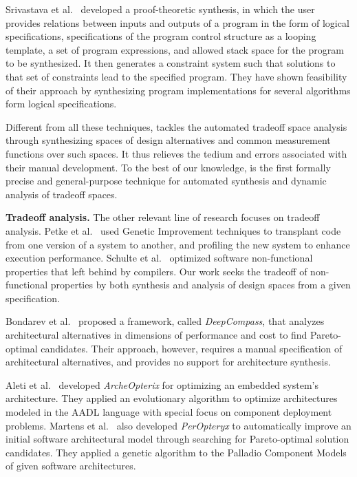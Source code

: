 \documentclass{sig-alternate}
\begin{document}
Srivastava et al.~\cite{srivastava_program_2010} developed a proof-theoretic synthesis, in which the user provides relations between inputs and outputs of a program in the form of logical specifications, specifications of the program control structure as a looping template, a set of program expressions, and allowed stack space for the program to be synthesized. It then generates a constraint system such that solutions to that set of constraints lead to the specified program. They have shown feasibility of their approach by synthesizing program implementations for several algorithms form logical specifications.

Different from all these techniques, \@approach tackles the automated tradeoff space analysis through synthesizing spaces of design alternatives and common measurement functions over such spaces. It thus relieves the tedium and errors associated with their manual development. To the best of our knowledge, \@approach is the first formally precise and general-purpose technique for automated synthesis and dynamic analysis of tradeoff spaces.

\textbf{Tradeoff analysis.}
The other relevant line of research focuses on tradeoff analysis.
Petke et al.~\cite{genetic_Improvement_code_transplate} used Genetic Improvement techniques to transplant code from one version of a system to another, and profiling the new system to enhance execution performance. Schulte et al.~\cite{post_compiler_optimize} optimized software non-functional properties that left behind by compilers. Our work seeks the tradeoff of non-functional properties by both synthesis and analysis of design spaces from a given specification.

Bondarev et al.~\cite{Bondarev_etal_2007} proposed a framework, called \emph{DeepCompass}, that analyzes architectural alternatives in dimensions of performance and cost to find Pareto-optimal candidates. Their approach, however, requires a manual specification of architectural alternatives, and provides no support for architecture synthesis.

Aleti et al.~\cite{ArcheOpterix} developed \emph{ArcheOpterix} for optimizing an embedded system's architecture.
They applied an evolutionary algorithm to optimize architectures modeled in the AADL language with special focus on component deployment problems.
Martens et al.~\cite{PerOpteryx} also developed \emph{PerOpteryx} to automatically improve an initial software architectural model through searching for Pareto-optimal solution candidates. They applied a genetic algorithm to the Palladio Component Models of given software architectures.
\end{document}
